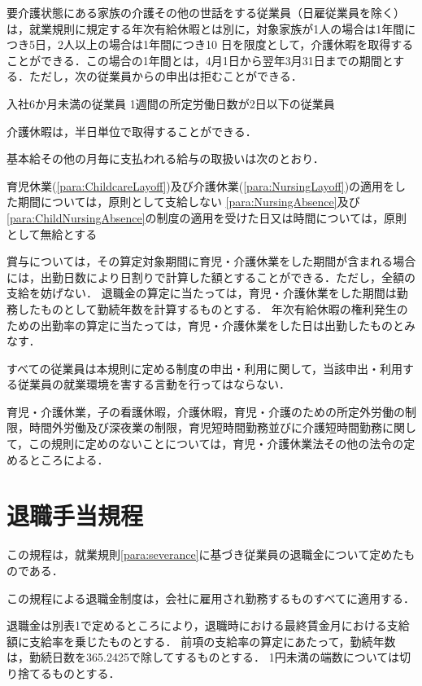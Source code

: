 \documentclass[11pt,a4paper]{jsarticle}
\begin{document}
要介護状態にある家族の介護その他の世話をする従業員（日雇従業員を除く）は，就業規則に規定する年次有給休暇とは別に，対象家族が1人の場合は1年間につき5日，2人以上の場合は1年間につき10 日を限度として，介護休暇を取得することができる．この場合の1年間とは，4月1日から翌年3月31日までの期間とする．ただし，次の従業員からの申出は拒むことができる．
\label{para:NursingAbsence}
\begin{enumerate}
	\itm 	入社6か月未満の従業員
	\itm 	1週間の所定労働日数が2日以下の従業員
\end{enumerate}
\term 介護休暇は，半日単位で取得することができる．

基本給その他の月毎に支払われる給与の取扱いは次のとおり．
\begin{enumerate}
	\itm 育児休業(\ref{para:ChildcareLayoff})及び介護休業(\ref{para:NursingLayoff})の適用をした期間については，原則として支給しない
	\itm \ref{para:NursingAbsence}及び\ref{para:ChildNursingAbsence}の制度の適用を受けた日又は時間については，原則として無給とする
\end{enumerate}
\term 賞与については，その算定対象期間に育児・介護休業をした期間が含まれる場合には，出勤日数により日割りで計算した額とすることができる．ただし，全額の支給を妨げない．
\term 退職金の算定に当たっては，育児・介護休業をした期間は勤務したものとして勤続年数を計算するものとする．
\term 年次有給休暇の権利発生のための出勤率の算定に当たっては，育児・介護休業をした日は出勤したものとみなす．

すべての従業員は本規則に定める制度の申出・利用に関して，当該申出・利用する従業員の就業環境を害する言動を行ってはならない．

育児・介護休業，子の看護休暇，介護休暇，育児・介護のための所定外労働の制限，時間外労働及び深夜業の制限，育児短時間勤務並びに介護短時間勤務に関して，この規則に定めのないことについては，育児・介護休業法その他の法令の定めるところによる．


\clearpage
\section{退職手当規程}

この規程は，就業規則\ref{para:severance}に基づき従業員の退職金について定めたものである．

この規程による退職金制度は，会社に雇用され勤務するものすべてに適用する．

退職金は別表1で定めるところにより，退職時における最終賃金月における支給額に支給率を乗じたものとする．
\term 前項の支給率の算定にあたって，勤続年数は，勤続日数を365.2425で除してするものとする．
\term 1円未満の端数については切り捨てるものとする．
\end{document}
